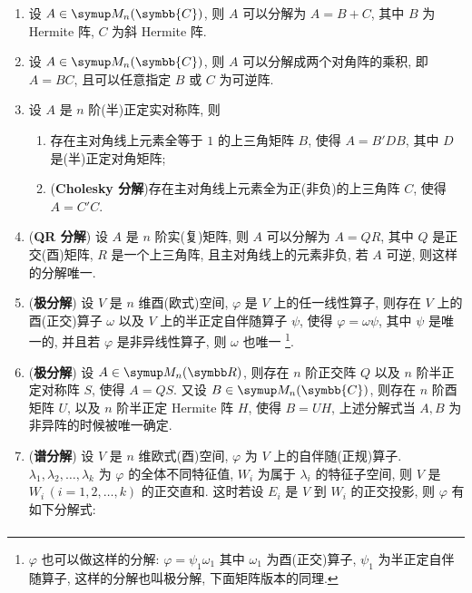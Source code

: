 \documentclass{ctexart}
\let\emph\textbf
\newcommand{\C}{\ensuremath{\symbb{C}}}
\begin{document}
    \begin{tcolorbox}[title={矩阵/线性算子分解}]
        \begin{enumerate}[resume=exer]
            \item 设 $ A \in \MM[\C] $, 则 $ A $ 可以分解为 $ A = B + C $, 其中 $ B $ 为 Hermite 阵, $ C $ 为斜 Hermite 阵.
            \item 设 $ A\in \MM[\C] $, 则 $ A $ 可以分解成两个对角阵的乘积, 即 $ A = BC $, 且可以任意指定 $ B $ 或 $ C $ 为可逆阵.
            \item 设 $ A $ 是 $ n $ 阶(半)正定实对称阵, 则
            \begin{enumerate}
                \item 存在主对角线上元素全等于 $ 1 $ 的上三角矩阵 $ B $, 使得 $ A = B'DB $, 其中 $ D $ 是(半)正定对角矩阵;
                \item (\emph{Cholesky 分解})存在主对角线上元素全为正(非负)的上三角阵 $ C $, 使得 $ A = C'C $. 
            \end{enumerate}
            \item (\emph{QR 分解}) 设 $ A $ 是 $ n $ 阶实(复)矩阵, 则 $ A $ 可以分解为 $ A = QR $, 其中 $ Q $ 是正交(酉)矩阵, $ R $ 是一个上三角阵, 且主对角线上的元素非负, 若 $ A $ 可逆, 则这样的分解唯一.
            \item (\emph{极分解}) 设 $ V $ 是 $ n $ 维酉(欧式)空间, $ \varphi $ 是 $ V $ 上的任一线性算子, 则存在 $ V $ 上的酉(正交)算子 $ \omega $ 以及 $ V $ 上的半正定自伴随算子 $ \psi $, 使得 $ \varphi = \omega\psi $, 其中 $ \psi $ 是唯一的, 并且若 $ \varphi $ 是非异线性算子, 则 $ \omega $ 也唯一 \footnote{ $ \varphi $ 也可以做这样的分解: $ \varphi = \psi_{1}\omega_{1} $ 其中 $ \omega_{1} $ 为酉(正交)算子, $ \psi_{1} $ 为半正定自伴随算子, 这样的分解也叫极分解, 下面矩阵版本的同理.}. 
            \item \label{item:矩阵极分解}(\emph{极分解}) 设 $ A \in \MM $, 则存在 $ n $ 阶正交阵 $ Q $ 以及 $ n $ 阶半正定对称阵 $ S $, 使得 $ A = QS $. 又设 $ B \in \MM[\C] $, 则存在 $ n $ 阶酉矩阵 $ U $, 以及 $ n $ 阶半正定 Hermite 阵 $ H $, 使得 $ B = UH $, 上述分解式当 $ A, B $ 为非异阵的时候被唯一确定.
            \item (\emph{谱分解}) 设 $ V $ 是 $ n $ 维欧式(酉)空间, $ \varphi $ 为 $ V $ 上的自伴随(正规)算子. $ \lambda_{1}, \lambda_{2}, \dots, \lambda_{k} $ 为 $ \varphi $ 的全体不同特征值, $ W_{i} $ 为属于 $ \lambda_{i} $ 的特征子空间, 则 $ V $ 是 $ W_{i}\,(i = 1, 2, \dots, k) $ 的正交直和. 这时若设 $ E_{i} $ 是 $ V $ 到 $ W_{i} $ 的正交投影, 则 $ \varphi $ 有如下分解式:
            \begin{align*}

\end{align*}
\end{enumerate}
\end{tcolorbox}
\end{document}
